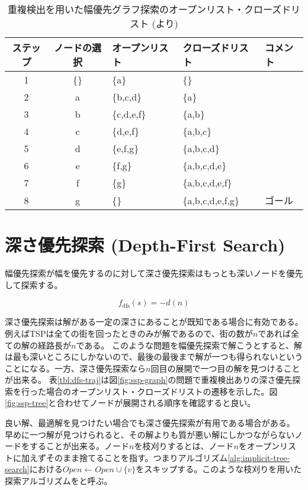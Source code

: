 \begin{table}[tbh]
\centering
\caption{重複検出を用いた幅優先グラフ探索のオープンリスト・クローズドリスト (\cite{edelkamp:2010:hst:1875144}より)}
\begin{tabular}{c|c|l|l|l}
  \toprule
	ステップ & ノードの選択 & オープンリスト & クローズドリスト & コメント \\ \midrule
	1 	  & \{\}       & \{a\}      & \{\} \\
	2     & a        & \{b,c,d\}  & \{a\} \\
	3     & b        & \{c,d,e,f\} & \{a,b\} \\
	4     & c        & \{d,e,f\}   & \{a,b,c\} \\
	5     & d        & \{e,f,g\}   & \{a,b,c,d\} \\
	6     & e        & \{f,g\}     & \{a,b,c,d,e\} \\
	7     & f        & \{g\}       & \{a,b,c,d,e,f\} \\
	8     & g        & \{\}        & \{a,b,c,d,e,f,g\} & ゴール \\
        \bottomrule
\end{tabular}
\label{tbl:brfs-traj}
\end{table}

\section{深さ優先探索 (Depth-First Search)}
\label{sec:depth-first-search}

幅優先探索が幅を優先するのに対して深さ優先探索はもっとも深いノードを優先して探索する。

\begin{equation}
  f_{\text{dfs}}(s) = -d(n)
\label{alg:dfs-open}
\end{equation}

深さ優先探索は解がある一定の深さにあることが既知である場合に有効である。
例えばTSPは全ての街を回ったときのみが解であるので、街の数が$n$であれば全ての解の経路長が$n$である。
このような問題を幅優先探索で解こうとすると、解は最も深いところにしかないので、最後の最後まで解が一つも得られないということになる。一方、深さ優先探索なら$n$回目の展開で一つ目の解を見つけることが出来る。
表\ref{tbl:dfs-traj}は図\ref{fig:ssp-graph}の問題で重複検出ありの深さ優先探索を行った場合のオープンリスト・クローズドリストの遷移を示した。図\ref{fig:ssp-tree}と合わせてノードが展開される順序を確認すると良い。

良い解、最適解を見つけたい場合でも深さ優先探索が有用である場合がある。
早めに一つ解が見つけられると、その解よりも質が悪い解にしかつながらないノードをすることが出来る。ノード$n$を枝刈りするとは、ノード$n$をオープンリストに加えずそのまま捨てることを指す。つまりアルゴリズム\ref{alg:implicit-tree-search}における$Open \leftarrow Open \cup \{v\}$をスキップする。このような枝刈りを用いた探索アルゴリズムをと呼ぶ。

